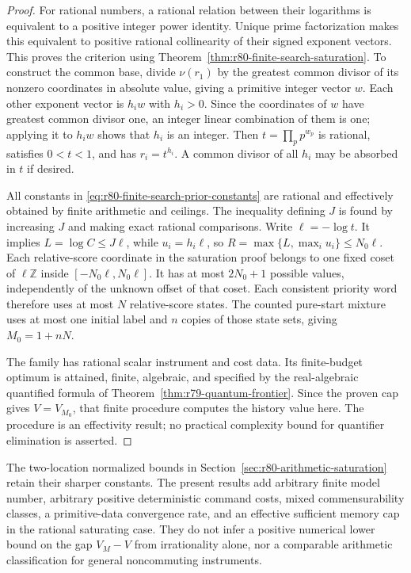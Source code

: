 \begin{proof}
For rational numbers, a rational relation between their logarithms
is equivalent to a positive integer power identity.  Unique prime
factorization makes this equivalent to positive rational
collinearity of their signed exponent vectors.  This proves the
criterion using Theorem~\ref{thm:r80-finite-search-saturation}.
To construct the common base, divide $\nu(r_1)$ by the greatest
common divisor of its nonzero coordinates in absolute value, giving
a primitive integer vector $w$.  Each other exponent vector is
$h_iw$ with $h_i>0$.  Since the coordinates of $w$ have greatest
common divisor one, an integer linear combination of them is one;
applying it to $h_iw$ shows that $h_i$ is an integer.  Then
$t=\prod_p p^{w_p}$ is rational, satisfies $0<t<1$, and has
$r_i=t^{h_i}$.  A common divisor of all $h_i$ may be absorbed in
$t$ if desired.

All constants in \eqref{eq:r80-finite-search-prior-constants} are
rational and effectively obtained by finite arithmetic and ceilings.
The inequality defining $J$ is found by increasing $J$ and making
exact rational comparisons.  Write $\ell=-\log t$.  It implies
$L=\log C\le J\ell$, while $u_i=h_i\ell$, so
$R=\max\{L,\max_i u_i\}\le N_0\ell$.
Each relative-score coordinate in the saturation proof belongs to
one fixed coset of $\ell\mathbb Z$ inside
$[-N_0\ell,N_0\ell]$.  It has at most $2N_0+1$ possible values,
independently of the unknown offset of that coset.  Each consistent
priority word therefore uses at most $N$ relative-score states.
The counted pure-start mixture uses at most one initial label and
$n$ copies of those state sets, giving $M_0=1+nN$.

The family has rational scalar instrument and cost data.  Its
finite-budget optimum is attained, finite, algebraic, and specified
by the real-algebraic quantified formula of
Theorem~\ref{thm:r79-quantum-frontier}.  Since the proven cap gives
$V=V_{M_0}$, that finite procedure computes the history value here.
The procedure is an effectivity result; no practical complexity
bound for quantifier elimination is asserted.
\end{proof}

The two-location normalized bounds in
Section~\ref{sec:r80-arithmetic-saturation} retain their sharper
constants.  The present results add arbitrary finite model number,
arbitrary positive deterministic command costs, mixed
commensurability classes, a primitive-data convergence rate, and an
effective sufficient memory cap in the rational saturating case.
They do not infer a positive numerical lower bound on the gap
$V_M-V$ from irrationality alone, nor a comparable arithmetic
classification for general noncommuting instruments.
